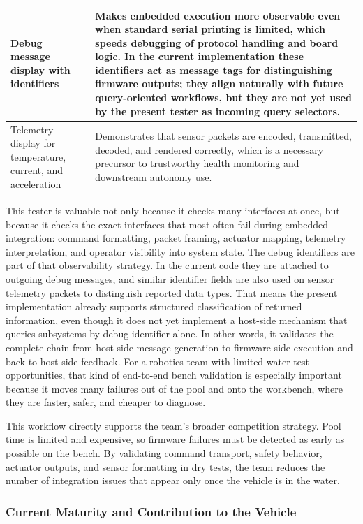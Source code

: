 \documentclass[conference]{IEEEtran}
\begin{document}
\begin{table}[htbp]
\begin{center}
\begin{tabularx}{\columnwidth}{|p{}|X|}
\hline
Debug message display with identifiers & Makes embedded execution more observable even when standard serial printing is limited, which speeds debugging of protocol handling and board logic. In the current implementation these identifiers act as message tags for distinguishing firmware outputs; they align naturally with future query-oriented workflows, but they are not yet used by the present tester as incoming query selectors. \\
\hline
Telemetry display for temperature, current, and acceleration & Demonstrates that sensor packets are encoded, transmitted, decoded, and rendered correctly, which is a necessary precursor to trustworthy health monitoring and downstream autonomy use. \\
\hline
\end{tabularx}
\end{center}
\end{table}

This tester is valuable not only because it checks many interfaces at once, but because it checks the exact interfaces that most often fail during embedded integration: command formatting, packet framing, actuator mapping, telemetry interpretation, and operator visibility into system state. The debug identifiers are part of that observability strategy. In the current code they are attached to outgoing debug messages, and similar identifier fields are also used on sensor telemetry packets to distinguish reported data types. That means the present implementation already supports structured classification of returned information, even though it does not yet implement a host-side mechanism that queries subsystems by debug identifier alone. In other words, it validates the complete chain from host-side message generation to firmware-side execution and back to host-side feedback. For a robotics team with limited water-test opportunities, that kind of end-to-end bench validation is especially important because it moves many failures out of the pool and onto the workbench, where they are faster, safer, and cheaper to diagnose.

This workflow directly supports the team's broader competition strategy. Pool time is limited and expensive, so firmware failures must be detected as early as possible on the bench. By validating command transport, safety behavior, actuator outputs, and sensor formatting in dry tests, the team reduces the number of integration issues that appear only once the vehicle is in the water.

\subsubsection{Current Maturity and Contribution to the Vehicle}
\end{document}
